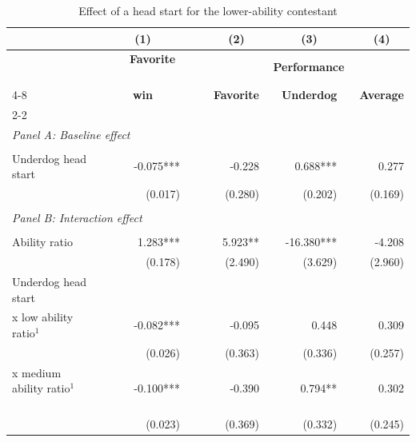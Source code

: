 \documentclass[11pt,a4paper]{article}
\begin{document}
	\begin{table}[H]
		\centering
		\caption{Effect of a head start for the lower-ability contestant} 
		\label{tab:table_main_head}
		\begin{tabular}{l r r r r r r r} 
			\toprule
            \toprule
   			& \multicolumn{1}{c}{\textbf{(1)}} &  &  \multicolumn{1}{c}{\textbf{(2)}} & & \multicolumn{1}{c}{\textbf{(3)}} & & \multicolumn{1}{c}{\textbf{(4)}}\\
      \midrule
			& \multicolumn{1}{c}{\textbf{~~~Favorite ~~~}} & ~~ &  \multicolumn{5}{c}{\textbf{Performance}}  \\
            \cline{4-8}
   			& \multicolumn{1}{c}{\textbf{win}} &  &  \multicolumn{1}{c}{\textbf{Favorite}} & & \multicolumn{1}{c}{\textbf{Underdog}} & & \multicolumn{1}{c}{\textbf{Average}}\\
            \cline{2-2} \cline{4-4} \cline{6-6} \cline{8-8} \\  
   			\multicolumn{8}{l}{\textit{Panel A: Baseline effect}}    \\            \vspace{0.01em}   \\
			Underdog head start  ~~~          & -0.075***    & & -0.228    & & 0.688***  & & 0.277    \\
			                                 & (0.017)      & & (0.280)   & & (0.202)   & & (0.169)  \\
            \rule{0pt}{0.3ex}\\
   			\multicolumn{8}{l}{\textit{Panel B: Interaction effect}}    \\            \vspace{0.01em}\\
			Ability ratio                    & 1.283***     & & 5.923**   & & -16.380*** & & -4.208  \\
			                                 & (0.178)      & & (2.490)   & & (3.629)    & & (2.960) \\
			Underdog head start  ~~~          &              & &           & &            & &         \\
			x low ability ratio$^1$ ~~~          & -0.082***    & &  -0.095   & & 0.448      & & 0.309   \\
			                                 & (0.026)      & & (0.363)   & & (0.336)    & & (0.257) \\
			x medium ability ratio$^1$ ~~~       & -0.100***    & &  -0.390   & & 0.794**    & & 0.302   \\
			                                 & (0.023)      & & (0.369)   & & (0.332)    & & (0.245) \\

\end{tabular}
\end{table}
\end{document}
